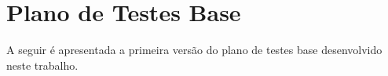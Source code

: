\chapter{Plano de Testes Base}

A seguir é apresentada a primeira versão do plano de testes base desenvolvido neste trabalho.




